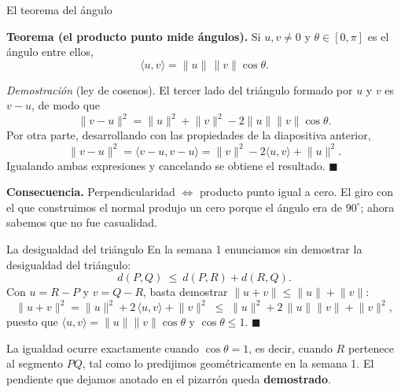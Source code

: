 \documentclass[aspectratio=169,10pt]{beamer}
\newcommand{\destaca}[1]{%
  \par\vspace{3pt}\noindent
  \colorbox{turquesaClaro}{%
    \parbox{\dimexpr\linewidth-2\fboxsep\relax}{\vspace{3pt}#1\vspace{3pt}}}%
  \par\vspace{3pt}}
\newcommand{\pp}[2]{\langle #1,#2\rangle}
\newcommand{\norma}[1]{\lVert #1\rVert}
\begin{document}
\begin{frame}{El teorema del ángulo}
  \destaca{\textbf{Teorema (el producto punto mide ángulos).}
  Si $u,v\neq 0$ y $\theta\in[0,\pi]$ es el ángulo entre ellos,
  \[
    \pp{u}{v}=\norma{u}\,\norma{v}\cos\theta .
  \]}

  \vspace{0.1cm}
  {\small \textit{Demostración} (ley de cosenos). El tercer lado del
  triángulo formado por $u$ y $v$ es $v-u$, de modo que
  \[
    \norma{v-u}^2=\norma{u}^2+\norma{v}^2
      -2\norma{u}\norma{v}\cos\theta .
  \]
  Por otra parte, desarrollando con las propiedades de la diapositiva
  anterior,
  \[
    \norma{v-u}^2=\pp{v-u}{v-u}
    =\norma{v}^2-2\pp{u}{v}+\norma{u}^2 .
  \]
  Igualando ambas expresiones y cancelando se obtiene el resultado.
  \hfill$\blacksquare$}

  \vspace{0.2cm}
  \destaca{\textbf{Consecuencia.} Perpendicularidad $\iff$ producto
  punto igual a cero. El giro con el que construimos el normal produjo un cero
  porque el ángulo era de $90^\circ$; ahora sabemos que no fue casualidad.}
\end{frame}
\begin{frame}{La desigualdad del triángulo}
  En la semana 1 enunciamos sin demostrar la desigualdad del
  triángulo:
  \[
    d(P,Q)\ \le\ d(P,R)+d(R,Q) .
  \]
  Con $u=R-P$ y $v=Q-R$, basta demostrar
  $\norma{u+v}\le\norma{u}+\norma{v}$:
  \[
    \norma{u+v}^2=\norma{u}^2+2\,\pp{u}{v}+\norma{v}^2
    \;\le\;
    \norma{u}^2+2\,\norma{u}\norma{v}+\norma{v}^2 ,
  \]
  puesto que $\pp{u}{v}=\norma{u}\norma{v}\cos\theta$ y
  $\cos\theta\le 1$. \hfill$\blacksquare$

  \vspace{0.4cm}
  \destaca{La igualdad ocurre exactamente cuando $\cos\theta=1$, es
  decir, cuando $R$ pertenece al segmento $PQ$, tal como lo predijimos
  geométricamente en la semana 1. El pendiente que dejamos anotado en
  el pizarrón queda \textbf{demostrado}.}
\end{frame}
\end{document}
